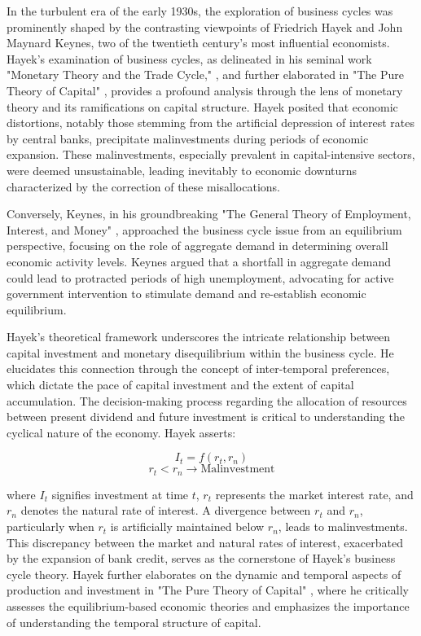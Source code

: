 \documentclass[12pt]{article}
\begin{document}
In the turbulent era of the early 1930s, the exploration of business cycles was prominently shaped by the contrasting
viewpoints of Friedrich Hayek and John Maynard Keynes, two of the twentieth century's most influential economists.
Hayek's examination of business cycles, as delineated in his seminal work "Monetary Theory and the Trade Cycle,"
\cite{Hay33}, and further elaborated in "The Pure Theory of Capital" \cite{Ha41}, provides a profound analysis
through the lens of monetary theory and its ramifications on capital structure. Hayek posited that economic distortions,
notably those stemming from the artificial depression of interest rates by central banks, precipitate malinvestments
during periods of economic expansion. These malinvestments, especially prevalent in capital-intensive sectors, were
deemed unsustainable, leading inevitably to economic downturns characterized by the correction of these misallocations. 

Conversely, Keynes, in his groundbreaking "The General Theory of Employment, Interest, and Money" \cite{Key36},
approached the business cycle issue from an equilibrium perspective, focusing on the role of aggregate demand in
determining overall economic activity levels. Keynes argued that a shortfall in aggregate demand could lead to
protracted periods of high unemployment, advocating for active government intervention to stimulate demand and
re-establish economic equilibrium. 

Hayek's theoretical framework underscores the intricate relationship between capital investment and monetary
disequilibrium within the business cycle. He elucidates this connection through the concept of inter-temporal
preferences, which dictate the pace of capital investment and the extent of capital accumulation. The decision-making
process regarding the allocation of resources between present dividend and future investment is critical to
understanding the cyclical nature of the economy. Hayek asserts: 

\[ I_t = f(r_t, r_n) \]
\[ r_t < r_n \rightarrow \text{Malinvestment} \]

where \( I_t \) signifies investment at time \( t \), \( r_t \) represents the market interest rate, and \( r_n \)
denotes the natural rate of interest. A divergence between \( r_t \) and \( r_n \), particularly when \( r_t \) is
artificially maintained below \( r_n \), leads to malinvestments. This discrepancy between the market and natural rates
of interest, exacerbated by the expansion of bank credit, serves as the cornerstone of Hayek's business cycle theory.
Hayek further elaborates on the dynamic and temporal aspects of production and investment in "The Pure Theory of
Capital" \cite{Ha41}, where he critically assesses the equilibrium-based economic theories and emphasizes the
importance of understanding the temporal structure of capital. 
\end{document}
